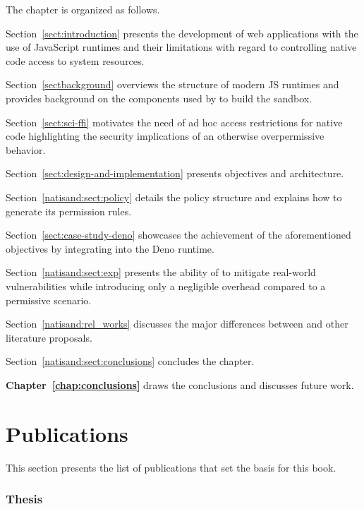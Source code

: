 \smallskip
\noindent The chapter is organized as follows.
\begin{compactitem}
    \item Section~\ref{sect:introduction} presents the development of
     web applications with the use of JavaScript runtimes and their
     limitations with regard to controlling native code access to
     system resources.
    \item Section~\ref{sectbackground} overviews the structure of
     modern JS runtimes and provides background on the components
     used by \natisand to build the sandbox.
    \item Section~\ref{sect:sci-ffi} motivates the need of
     ad hoc access restrictions for native code highlighting the
     security implications of an otherwise overpermissive behavior.
    \item Section~\ref{sect:design-and-implementation} presents
     \natisand objectives and architecture.
    \item Section~\ref{natisand:sect:policy} details the policy
     structure and explains how to generate its permission rules.
    \item Section~\ref{sect:case-study-deno} showcases the achievement
     of the aforementioned objectives by integrating \natisand into
     the Deno runtime.
    \item Section~\ref{natisand:sect:exp} presents the ability of
     \natisand to mitigate real-world vulnerabilities while
     introducing only a negligible overhead compared to a permissive
     scenario.
    \item Section~\ref{natisand:rel_works} discusses the major
     differences between \natisand and other literature proposals.
    \item Section~\ref{natisand:sect:conclusions} concludes the chapter.
\end{compactitem}
\medskip

\textbf{Chapter~\ref{chap:conclusions}} draws the conclusions and
discusses future work.

\section{Publications}

This section presents the list of publications that set the basis for this book.

\subsubsection*{Thesis}

